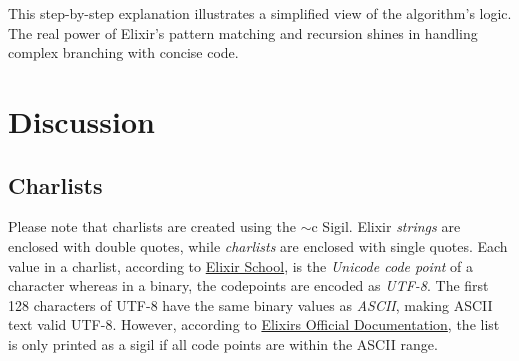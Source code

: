 \documentclass[a4paper,11pt]{article}
\begin{document}
\noindent This step-by-step explanation illustrates a simplified view of the algorithm's logic. The real power of Elixir's pattern matching and recursion shines in handling complex branching with concise code.



\section*{Discussion}
\label{sec:discussion}

\subsection*{Charlists}
Please note that charlists are created using the
$\sim$c Sigil.
Elixir \emph{strings} are enclosed with double quotes,
while \emph{charlists} are enclosed with single quotes.
Each value in a charlist, according to
\href{https://elixirschool.com/en/lessons/basics/strings#charlists-1}{Elixir School},
is the \emph{Unicode code point} of a character whereas in a binary,
the codepoints are encoded as \emph{UTF-8}.
The first 128 characters of UTF-8 have the same binary values as \emph{ASCII},
making ASCII text valid UTF-8.
However, according to
\href{https://hexdocs.pm/elixir/binaries-strings-and-charlists.html}{Elixirs Official Documentation},
the list is only printed as a sigil if all code points are within the ASCII range.
\end{document}
